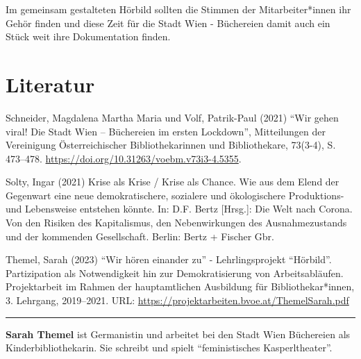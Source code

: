 \documentclass[a4paper,
fontsize=11pt,
oneside,
numbers=noperiodatend,
parskip=half-,
bibliography=totoc,
final
]{scrartcl}
\begin{document}
Im gemeinsam gestalteten Hörbild sollten die Stimmen der
Mitarbeiter*innen ihr Gehör finden und diese Zeit für die Stadt Wien -
Büchereien damit auch ein Stück weit ihre Dokumentation finden.

\hypertarget{literatur}{%
\section{Literatur}\label{literatur}}

Schneider, Magdalena Martha Maria und Volf, Patrik-Paul (2021)
\enquote{Wir gehen viral! Die Stadt Wien -- Büchereien im ersten
Lockdown}, Mitteilungen der Vereinigung Österreichischer
Bibliothekarinnen und Bibliothekare, 73(3-4), S. 473--478.
\url{https://doi.org/10.31263/voebm.v73i3-4.5355}.

Solty, Ingar (2021) Krise als Krise / Krise als Chance. Wie aus dem
Elend der Gegenwart eine neue demokratischere, sozialere und
ökologischere Produktions- und Lebensweise entstehen könnte. In: D.F.
Bertz {[}Hrsg.{]}: Die Welt nach Corona. Von den Risiken des
Kapitalismus, den Nebenwirkungen des Ausnahmezustands und der kommenden
Gesellschaft. Berlin: Bertz + Fischer Gbr.

Themel, Sarah (2023) \enquote{Wir hören einander zu} - Lehrlingsprojekt
\enquote{Hörbild}. Partizipation als Notwendigkeit hin zur
Demokratisierung von Arbeitsabläufen. Projektarbeit im Rahmen der
hauptamtlichen Ausbildung für Bibliothekar*innen, 3. Lehrgang,
2019--2021. URL: \url{https://projektarbeiten.bvoe.at/ThemelSarah.pdf}

\begin{center}\rule{0.5\linewidth}{0.5pt}\end{center}

\textbf{Sarah Themel} ist Germanistin und arbeitet bei den Stadt Wien
Büchereien als Kinderbibliothekarin. Sie schreibt und spielt
\enquote{feministisches Kasperltheater}.
\end{document}
